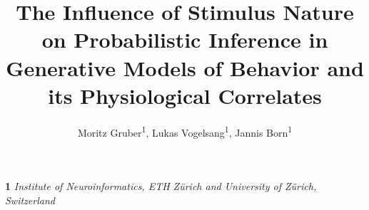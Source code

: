 \documentclass{article}
\begin{document}
\title{The Influence of Stimulus Nature on Probabilistic Inference in Generative Models of Behavior and its Physiological Correlates}




\author{\name Moritz Gruber\textsuperscript{1}, Lukas Vogelsang\textsuperscript{1}, Jannis Born\textsuperscript{1}}
\maketitle

\vspace{-1cm}
\indent \textbf{1} \textit{Institute of Neuroinformatics, ETH Z\"urich and University of Z\"urich, Switzerland}  \\ \\
\bigskip
\end{document}
